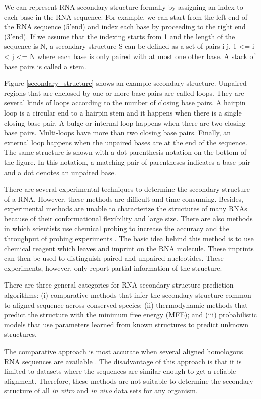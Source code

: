 We can represent RNA secondary structure formally by assigning an index to each base in the RNA sequence. For example, we can start from the left end of the RNA sequence (5’end) and index each base by proceeding to the right end (3’end). If we assume that the indexing starts from 1 and the length of the sequence is N, a secondary structure S can be defined as a set of pairs i-j, 1 <= i < j <= N where each base is only paired with at most one other base. A stack of base pairs is called a stem.

Figure \ref{secondary_structure} shows an example secondary structure. Unpaired regions that are enclosed by one or more base pairs are called loops. They are several kinds of loops according to the number of closing base pairs. A hairpin loop is a circular end to a hairpin stem and it happens when there is a single closing base pair. A bulge or internal loop happens when there are two closing base pairs. Multi-loops have more than two closing base pairs. Finally, an external loop happens when the unpaired bases are at the end of the sequence. The same structure is shown with a dot-parenthesis notation on the bottom of the figure. In this notation, a matching pair of parentheses indicates a base pair and a dot denotes an unpaired base. 

There are several experimental techniques to determine the secondary structure of a RNA. However, these methods are difficult and time-consuming. Besides, experimental methods are unable to characterize the structures of many RNAs because of their conformational flexibility and large size. There are also methods in which scientists use chemical probing to increase the accuracy and the throughput of probing experiments \cite{kertesz_2010, FragSeq_2010, SHAPEseq_2011}. The basic idea behind this method is to use chemical reagent which leaves and imprint on the RNA molecule. These imprints can then be used to distinguish paired and unpaired nucleotides. These experiments, however, only report partial information of the structure.

There are three general categories for RNA secondary structure prediction algorithms: (i) comparative methods that infer the secondary structure common to aligned sequence across conserved species; (ii) thermodynamic methods that predict the structure with the minimum free energy (MFE); and (iii) probabilistic models that use parameters learned from known structures to predict unknown structures.

The comparative approach is most accurate when several aligned homologous RNA sequences are available \cite{gardner_04}. The disadvantage of this approach is that it is limited to datasets where the sequences are similar enough to get a reliable alignment. Therefore, these methods are not suitable to determine the secondary structure of all \textit{in vitro} and \textit{in vivo} data sets for any organism.

